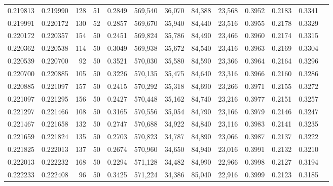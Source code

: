 \begin{tabular}{rrrrrrrrrrrrr}
0.219813 & 0.219990 &   128 &  51 &                                     0.2849 & 569,540 &  36,070 &  84,388 &  23,568 & 0.3952 & 0.2183 & 0.3341 \\
0.219991 & 0.220172 &   130 &  52 &                                     0.2857 & 569,670 &  35,940 &  84,440 &  23,516 & 0.3955 & 0.2178 & 0.3329 \\
0.220172 & 0.220357 &   154 &  50 &                                     0.2451 & 569,824 &  35,786 &  84,490 &  23,466 & 0.3960 & 0.2174 & 0.3315 \\
0.220362 & 0.220538 &   114 &  50 &                                     0.3049 & 569,938 &  35,672 &  84,540 &  23,416 & 0.3963 & 0.2169 & 0.3304 \\
0.220539 & 0.220700 &    92 &  50 &                                     0.3521 & 570,030 &  35,580 &  84,590 &  23,366 & 0.3964 & 0.2164 & 0.3296 \\
0.220700 & 0.220885 &   105 &  50 &                                     0.3226 & 570,135 &  35,475 &  84,640 &  23,316 & 0.3966 & 0.2160 & 0.3286 \\
0.220885 & 0.221097 &   157 &  50 &                                     0.2415 & 570,292 &  35,318 &  84,690 &  23,266 & 0.3971 & 0.2155 & 0.3272 \\
0.221097 & 0.221295 &   156 &  50 &                                     0.2427 & 570,448 &  35,162 &  84,740 &  23,216 & 0.3977 & 0.2151 & 0.3257 \\
0.221297 & 0.221466 &   108 &  50 &                                     0.3165 & 570,556 &  35,054 &  84,790 &  23,166 & 0.3979 & 0.2146 & 0.3247 \\
0.221467 & 0.221658 &   132 &  50 &                                     0.2747 & 570,688 &  34,922 &  84,840 &  23,116 & 0.3983 & 0.2141 & 0.3235 \\
0.221659 & 0.221824 &   135 &  50 &                                     0.2703 & 570,823 &  34,787 &  84,890 &  23,066 & 0.3987 & 0.2137 & 0.3222 \\
0.221825 & 0.222013 &   137 &  50 &                                     0.2674 & 570,960 &  34,650 &  84,940 &  23,016 & 0.3991 & 0.2132 & 0.3210 \\
0.222013 & 0.222232 &   168 &  50 &                                     0.2294 & 571,128 &  34,482 &  84,990 &  22,966 & 0.3998 & 0.2127 & 0.3194 \\
0.222233 & 0.222408 &    96 &  50 &                                     0.3425 & 571,224 &  34,386 &  85,040 &  22,916 & 0.3999 & 0.2123 & 0.3185 \\

\end{tabular}
